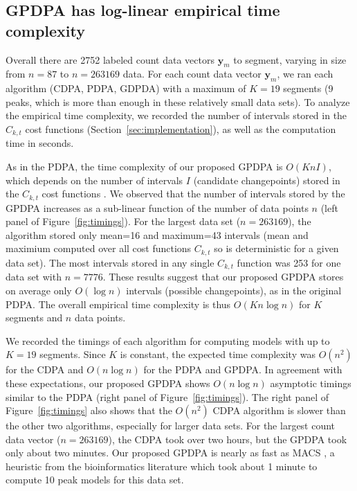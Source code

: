 \documentclass[twoside,11pt]{article}
\begin{document}
\subsection{GPDPA has log-linear empirical time complexity}
\label{sec:results_time}

Overall there are 2752 labeled count data vectors $\mathbf y_m$ to segment,
varying in size from $n=87$ to $n=263169$ data. For each count data
vector $\mathbf y_m$, we ran each algorithm (CDPA, PDPA, GDPDA) with a
maximum of $K=19$ segments (9 peaks, which is more than enough in these
 relatively small data sets).
To analyze the empirical time complexity,
we recorded the number of intervals stored in the $C_{k,t}$ cost
functions (Section~\ref{sec:implementation}), as well as the computation
time in seconds.


As in the PDPA, the time complexity of our proposed GPDPA is
$O(K n I)$, which depends on the number of intervals $I$ (candidate
changepoints) stored in the $C_{k,t}$ cost functions
\citep{pruned-dp-new}. We observed that the number of intervals stored
by the GPDPA increases as a sub-linear function of the number of data
points $n$ (left panel of Figure~\ref{fig:timings}). For the largest data
set ($n=263169$), the algorithm stored only mean=16 and maximum=43
intervals (mean and maximium computed over all cost functions
$C_{k,t}$ so is deterministic for a given data set). The most
intervals stored in any single $C_{k,t}$ function was 253 for one data set with $n=7776$. These results
suggest that our proposed GPDPA stores on average only $O(\log n)$
intervals (possible changepoints), as in the original PDPA. The
overall empirical time complexity is thus $O(K n \log n)$ for $K$
segments and $n$ data points.

We recorded the timings of each algorithm for computing models with up
to $K=19$ segments. Since $K$ is constant, the expected time
complexity was $O(n^2)$ for the CDPA and $O(n \log n)$ for the PDPA
and GPDPA. In agreement with these expectations, our proposed GPDPA
shows $O(n\log n)$ asymptotic timings similar to the PDPA (right panel of
Figure~\ref{fig:timings}). 
The right panel of
Figure~\ref{fig:timings} also shows that the $O(n^2)$ CDPA algorithm is slower than the other
two algorithms, especially for larger data sets. For the largest count
data vector ($n=263169$), the CDPA took over two hours, but the GPDPA
took only
about two minutes. Our proposed GPDPA is nearly as fast as MACS
\citep{MACS}, a heuristic from the bioinformatics literature which
took about 1 minute to compute 10 peak models for this data set. 
\end{document}
